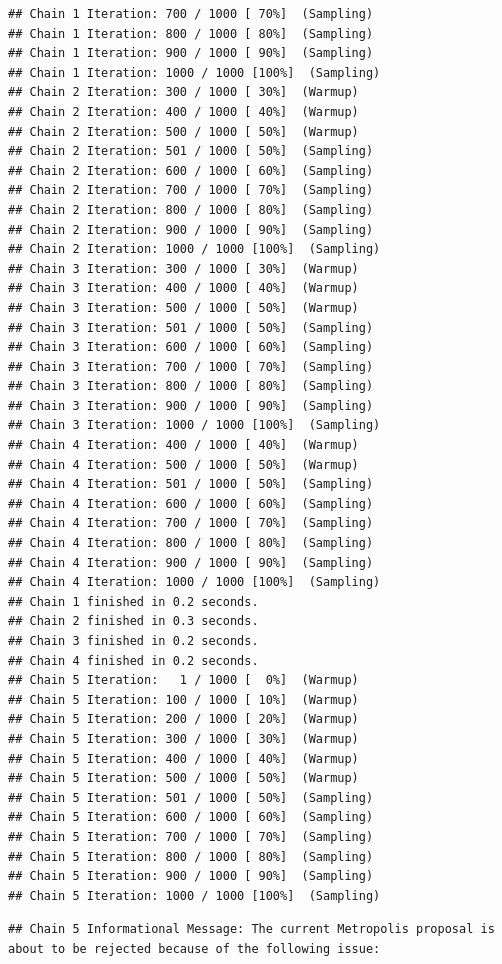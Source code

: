 \documentclass[
]{book}
\begin{document}
\begin{verbatim}
## Chain 1 Iteration: 700 / 1000 [ 70%]  (Sampling) 
## Chain 1 Iteration: 800 / 1000 [ 80%]  (Sampling) 
## Chain 1 Iteration: 900 / 1000 [ 90%]  (Sampling) 
## Chain 1 Iteration: 1000 / 1000 [100%]  (Sampling) 
## Chain 2 Iteration: 300 / 1000 [ 30%]  (Warmup) 
## Chain 2 Iteration: 400 / 1000 [ 40%]  (Warmup) 
## Chain 2 Iteration: 500 / 1000 [ 50%]  (Warmup) 
## Chain 2 Iteration: 501 / 1000 [ 50%]  (Sampling) 
## Chain 2 Iteration: 600 / 1000 [ 60%]  (Sampling) 
## Chain 2 Iteration: 700 / 1000 [ 70%]  (Sampling) 
## Chain 2 Iteration: 800 / 1000 [ 80%]  (Sampling) 
## Chain 2 Iteration: 900 / 1000 [ 90%]  (Sampling) 
## Chain 2 Iteration: 1000 / 1000 [100%]  (Sampling) 
## Chain 3 Iteration: 300 / 1000 [ 30%]  (Warmup) 
## Chain 3 Iteration: 400 / 1000 [ 40%]  (Warmup) 
## Chain 3 Iteration: 500 / 1000 [ 50%]  (Warmup) 
## Chain 3 Iteration: 501 / 1000 [ 50%]  (Sampling) 
## Chain 3 Iteration: 600 / 1000 [ 60%]  (Sampling) 
## Chain 3 Iteration: 700 / 1000 [ 70%]  (Sampling) 
## Chain 3 Iteration: 800 / 1000 [ 80%]  (Sampling) 
## Chain 3 Iteration: 900 / 1000 [ 90%]  (Sampling) 
## Chain 3 Iteration: 1000 / 1000 [100%]  (Sampling) 
## Chain 4 Iteration: 400 / 1000 [ 40%]  (Warmup) 
## Chain 4 Iteration: 500 / 1000 [ 50%]  (Warmup) 
## Chain 4 Iteration: 501 / 1000 [ 50%]  (Sampling) 
## Chain 4 Iteration: 600 / 1000 [ 60%]  (Sampling) 
## Chain 4 Iteration: 700 / 1000 [ 70%]  (Sampling) 
## Chain 4 Iteration: 800 / 1000 [ 80%]  (Sampling) 
## Chain 4 Iteration: 900 / 1000 [ 90%]  (Sampling) 
## Chain 4 Iteration: 1000 / 1000 [100%]  (Sampling) 
## Chain 1 finished in 0.2 seconds.
## Chain 2 finished in 0.3 seconds.
## Chain 3 finished in 0.2 seconds.
## Chain 4 finished in 0.2 seconds.
## Chain 5 Iteration:   1 / 1000 [  0%]  (Warmup) 
## Chain 5 Iteration: 100 / 1000 [ 10%]  (Warmup) 
## Chain 5 Iteration: 200 / 1000 [ 20%]  (Warmup) 
## Chain 5 Iteration: 300 / 1000 [ 30%]  (Warmup) 
## Chain 5 Iteration: 400 / 1000 [ 40%]  (Warmup) 
## Chain 5 Iteration: 500 / 1000 [ 50%]  (Warmup) 
## Chain 5 Iteration: 501 / 1000 [ 50%]  (Sampling) 
## Chain 5 Iteration: 600 / 1000 [ 60%]  (Sampling) 
## Chain 5 Iteration: 700 / 1000 [ 70%]  (Sampling) 
## Chain 5 Iteration: 800 / 1000 [ 80%]  (Sampling) 
## Chain 5 Iteration: 900 / 1000 [ 90%]  (Sampling) 
## Chain 5 Iteration: 1000 / 1000 [100%]  (Sampling)
\end{verbatim}

\begin{verbatim}
## Chain 5 Informational Message: The current Metropolis proposal is about to be rejected because of the following issue:
\end{verbatim}
\end{document}

